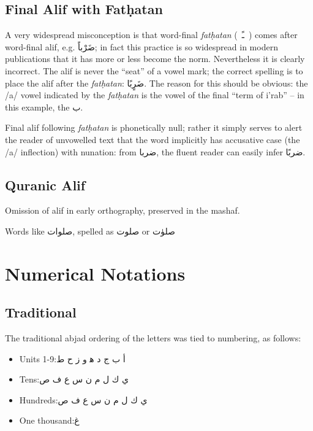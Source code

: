 \documentclass[11pt]{article}
\begin{document}
\subsection{Final Alif with Fatḥatan}

A very widespread misconception is that word-final \textit{fatḥatan}
(\ \textarabic{ـً}\ ) comes after word-final alif, e.g.
\textarabic{ضَرْباً}; in fact this practice is so widespread in modern
publications that it has more or less become the norm. Nevertheless it
is clearly incorrect. The alif is never the “seat” of a vowel mark;
the correct spelling is to place the alif after the \textit{fatḥatan}:
\textarabic{ضَرٍبًا}. The reason for this should be obvious: the /a/
vowel indicated by the \textit{fatḥatan} is the vowel of the final
“term of i'rab” -- in this example, the \textarabic{ب}.

Final alif following \textit{fatḥatan} is phonetically null; rather it
simply serves to alert the reader of unvowelled text that the word
implicitly has accusative case (the /a/ inflection) with nunation:
from \textarabic{ضربا}, the fluent reader can easily infer
\textarabic{ضربًا}.

\subsection{Quranic Alif}

Omission of alif in early orthography, preserved in the mashaf.

Words like \textarabic{صلوات}, spelled as \textarabic{صلوت} or \textarabic{صلوٰت}

\section{Numerical Notations}

\subsection{Traditional}

The traditional abjad ordering of the letters was tied to numbering,
as follows:

\begin{itemize}
\item Units 1-9:\quad \textarabic{أ ب ج د ه‍ و ز ح ط}
\item Tens:\quad \textarabic{ي ك ل م ن س ع ف ص}
\item Hundreds:\quad \textarabic{ي ك ل م ن س ع ف ص}
\item One thousand:\quad \textarabic{غ}
\end{itemize}
\end{document}
